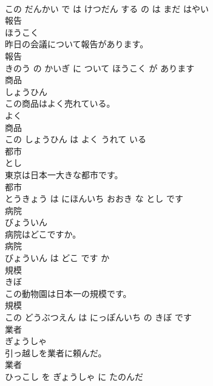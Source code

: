 \documentclass[8pt]{extreport}
\begin{document}
\begin{CJK}{UTF8}{min}
\\	この だんかい で は けつだん する の は まだ はやい			
\\	報告	
\\	ほうこく			
\\	昨日の会議について報告があります。	
\\	報告 
\\	きのう の かいぎ に ついて ほうこく が あります			
\\	商品	
\\	しょうひん			
\\	この商品はよく売れている。	
\\	よく 
\\	商品 
\\	この しょうひん は よく うれて いる			
\\	都市	
\\	とし			
\\	東京は日本一大きな都市です。	
\\	都市 
\\	とうきょう は にほんいち おおき な とし です			
\\	病院	
\\	びょういん			
\\	病院はどこですか。	
\\	病院 
\\	びょういん は どこ です か			
\\	規模	
\\	きぼ			
\\	この動物園は日本一の規模です。	
\\	規模 
\\	この どうぶつえん は にっぽんいち の きぼ です			
\\	業者	
\\	ぎょうしゃ			
\\	引っ越しを業者に頼んだ。	
\\	業者 
\\	ひっこし を ぎょうしゃ に たのんだ			
\end{CJK}
\end{document}
